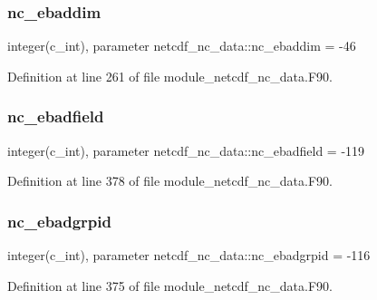 \mbox{\label{namespacenetcdf__nc__data_aed9c733c3cdb4e6cd5544fbc240739df}} 
\subsubsection{\texorpdfstring{nc\+\_\+ebaddim}{nc\_ebaddim}}
{\footnotesize\ttfamily integer(c\+\_\+int), parameter netcdf\+\_\+nc\+\_\+data\+::nc\+\_\+ebaddim = -\/46}



Definition at line 261 of file module\+\_\+netcdf\+\_\+nc\+\_\+data.\+F90.

\mbox{\label{namespacenetcdf__nc__data_a0cbc5e39141140f6ae945c7f1051cadb}} 
\subsubsection{\texorpdfstring{nc\+\_\+ebadfield}{nc\_ebadfield}}
{\footnotesize\ttfamily integer(c\+\_\+int), parameter netcdf\+\_\+nc\+\_\+data\+::nc\+\_\+ebadfield = -\/119}



Definition at line 378 of file module\+\_\+netcdf\+\_\+nc\+\_\+data.\+F90.

\mbox{\label{namespacenetcdf__nc__data_a016aacc26702e1653ed70acc2fe43f80}} 
\subsubsection{\texorpdfstring{nc\+\_\+ebadgrpid}{nc\_ebadgrpid}}
{\footnotesize\ttfamily integer(c\+\_\+int), parameter netcdf\+\_\+nc\+\_\+data\+::nc\+\_\+ebadgrpid = -\/116}



Definition at line 375 of file module\+\_\+netcdf\+\_\+nc\+\_\+data.\+F90.


